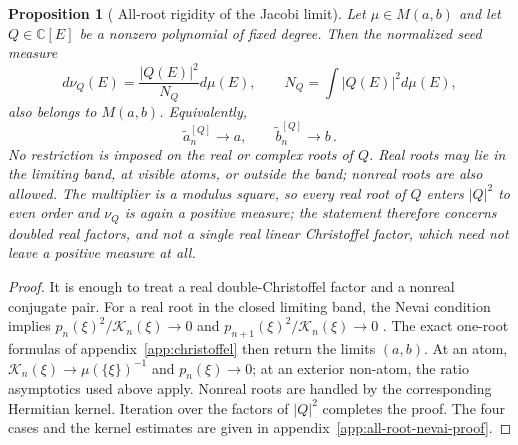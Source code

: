 \documentclass[a4paper,11pt]{article}
\def\dd{d}%
\newtheorem{proposition}{Proposition}[section]
\theoremstyle{definition}
\theoremstyle{remark}
\newcommand{\dd}{\mathrm d}
\newcommand{\CC}{\mathbb C}
\begin{document}
\begin{proposition}[%
All-root rigidity of the Jacobi limit]
\label{prop:nevai-rigidity}
Let $\mu\in M(a,b)$ and let $Q\in\CC[E]$ be a nonzero polynomial of fixed degree.  Then the
normalized seed measure
\begin{equation}
   \dd\nu_Q(E)=\frac{|Q(E)|^2}{N_Q}\dd\mu(E),
   \qquad
   N_Q=\int |Q(E)|^2\dd\mu(E),
\end{equation}
also belongs to $M(a,b)$.  Equivalently,
\begin{equation}
   \widetilde a_n^{[Q]}\longrightarrow a,
   \qquad
   \widetilde b_n^{[Q]}\longrightarrow b \,.
   \label{eq:nevai-rigidity}
\end{equation}
No restriction is imposed on the real or complex roots of $Q$.  Real roots may lie in the
limiting band, at visible atoms, or outside the band; nonreal roots are also allowed. The multiplier is a modulus square, so every real root of $Q$ enters $|Q|^2$ to even order and
$\nu_Q$ is again a positive measure; the statement therefore concerns doubled real factors, and
not a single real linear Christoffel factor, which need not leave a positive measure at all.
\end{proposition}

\begin{proof}

It is enough to treat a real double-Christoffel factor and a nonreal conjugate pair.  For a
real root in the closed limiting band, the Nevai condition implies
$p_n(\xi)^2/\mathcal K_n(\xi)\to0$ and
$p_{n+1}(\xi)^2/\mathcal K_n(\xi)\to0$ \cite{BreuerLastSimon2009}.  The exact one-root formulas of
appendix~\ref{app:christoffel} then return the limits $(a,b)$.  At an atom,
$\mathcal K_n(\xi)\to\mu(\{\xi\})^{-1}$ and $p_n(\xi)\to0$; at an exterior non-atom, the ratio
asymptotics used above apply.  Nonreal roots are handled by the corresponding Hermitian kernel.
Iteration over the factors of $|Q|^2$ completes the proof.  The four cases and the kernel
estimates are given in appendix~\ref{app:all-root-nevai-proof}.\qedhere

\end{proof}
\end{document}
